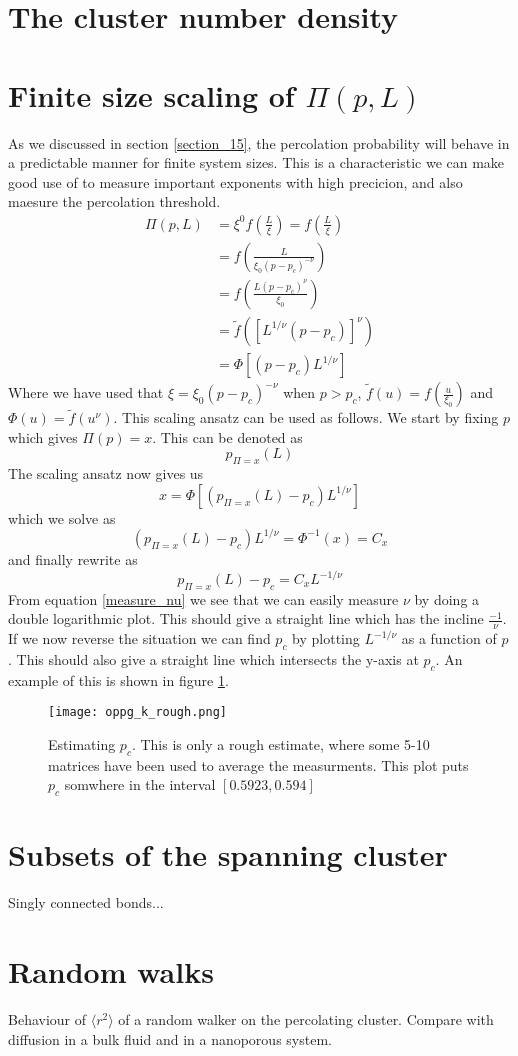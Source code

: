 \documentclass[a4paper,english, 10pt, twoside]{article}
\begin{document}
\section{The cluster number density}

\section{Finite size scaling of $\Pi(p,L)$}
As we discussed in section \ref{section_15}, the percolation probability will behave in a predictable manner for finite 
system sizes. This is a characteristic we can make good use of to measure important exponents with high precicion, and also 
maesure the percolation threshold.
\begin{align*}
 \Pi(p,L) &= \xi^0f\left(\frac{L}{\xi}\right) = f\left(\frac{L}{\xi}\right)\\
 &= f\left(\frac{L}{\xi_0(p-p_c)^{-\nu}}\right)\\
 &= f\left(\frac{L(p-p_c)^\nu}{\xi_0}\right)\\
  &= \tilde{f}\left(\left[L^{1/\nu}(p-p_c)\right]^\nu\right)\\
  &= \Phi\left[\left(p-p_c\right)L^{1/\nu}\right]
\end{align*}
Where we have used that $\xi = \xi_0(p-p_c)^{-\nu}$ when $p>p_c$, $\tilde{f}(u) = f\left(\frac{u}{\xi_0}\right)$ and $\Phi(u)
= \tilde{f}(u^\nu)$. This scaling ansatz can be used as follows. We start by fixing $p$ which gives $\Pi(p) = x$. This can be 
denoted as 
\begin{equation}
 p_{\Pi=x}\left(L\right)
\end{equation}
The scaling ansatz now gives us
\begin{equation}
 x = \Phi\left[\left( p_{\Pi=x}\left(L\right)-p_c\right)L^{1/\nu}\right]
\end{equation}
which we solve as 
$$
\left(p_{\Pi=x}\left(L\right)-p_c\right)L^{1/\nu} = \Phi^{-1}(x) = C_x
$$
and finally rewrite as
\begin{equation}\label{measure_nu}
 p_{\Pi=x}\left(L\right)-p_c = C_xL^{-1/\nu}
\end{equation}
From equation \ref{measure_nu} we see that we can easily measure $\nu$ by doing a double logarithmic plot. This should give a 
straight line which has the incline $\frac{-1}{\nu}$. \\
If we now reverse the situation we can find $p_c$ by plotting $L^{-1/\nu}$ as a function of $p$. This should also give a straight 
line which intersects the y-axis at $p_c$. An example of this is shown in figure \ref{measure_pc}.
\begin{figure}[H]
\centering
\texttt{[image: oppg\_k\_rough.png]}
\caption{Estimating $p_c$. This is only a rough estimate, where some 5-10 matrices have been used to average the measurments. 
This plot puts $p_c$ somwhere in the interval $[0.5923, 0.594]$}
\label{measure_pc}
\end{figure}

\section{Subsets of the spanning cluster}
Singly connected bonds...

\section{Random walks}
Behaviour of $\langle r^2\rangle$ of a random walker on the percolating cluster. Compare with diffusion in a bulk fluid and in 
a nanoporous system.
\end{document}
